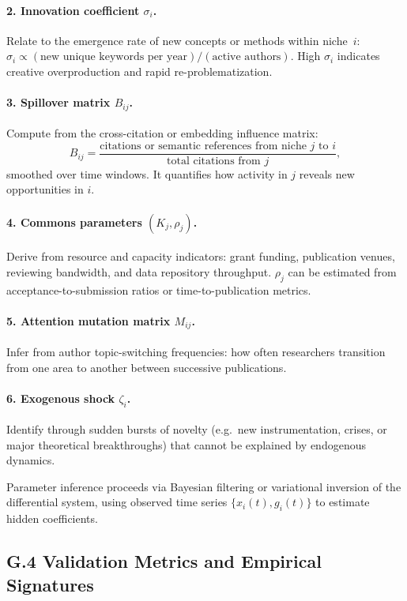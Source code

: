\documentclass[11pt,a4paper,titlepage]{article}
\theoremstyle{definition}
\begin{document}
\begin{itemize}
\paragraph{2. Innovation coefficient $\sigma_i$.}
Relate to the emergence rate of new concepts or methods within niche~$i$:
$\sigma_i \propto (\text{new unique keywords per year}) / (\text{active authors})$.
High $\sigma_i$ indicates creative overproduction and rapid re-problematization.

\paragraph{3. Spillover matrix $B_{ij}$.}
Compute from the cross-citation or embedding influence matrix:
\[
B_{ij} = \frac{\text{citations or semantic references from niche $j$ to $i$}}{\text{total citations from $j$}},
\]
smoothed over time windows.  It quantifies how activity in $j$ reveals new opportunities in $i$.

\paragraph{4. Commons parameters $(K_j,\rho_j)$.}
Derive from resource and capacity indicators:
grant funding, publication venues, reviewing bandwidth, and data repository throughput.
$\rho_j$ can be estimated from acceptance-to-submission ratios or time-to-publication metrics.

\paragraph{5. Attention mutation matrix $M_{ij}$.}
Infer from author topic-switching frequencies:
how often researchers transition from one area to another between successive publications.

\paragraph{6. Exogenous shock $\zeta_i$.}
Identify through sudden bursts of novelty (e.g.\ new instrumentation, crises, or major theoretical breakthroughs)
that cannot be explained by endogenous dynamics.

Parameter inference proceeds via Bayesian filtering or variational inversion of the differential system,
using observed time series $\{x_i(t),g_i(t)\}$ to estimate hidden coefficients.

\subsection*{G.4 Validation Metrics and Empirical Signatures}


\end{itemize}
\end{document}
